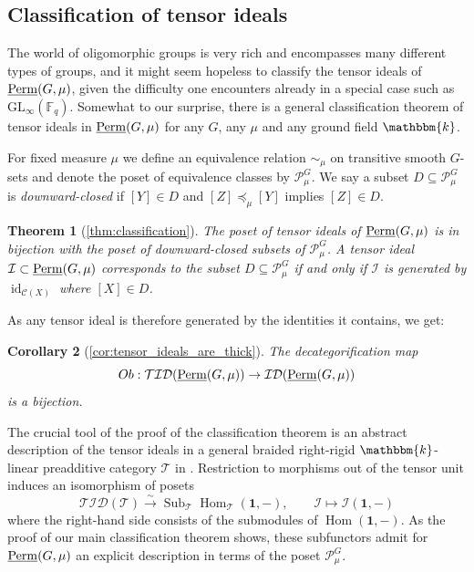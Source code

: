 \documentclass[11pt,a4paper]{amsart}
\theoremstyle{plain}%
\newtheorem{introtheorem}{Theorem}
\newtheorem{introcorollary}[introtheorem]{Corollary}
\theoremstyle{definition}
\theoremstyle{remark}
\newcommand{\Hom}{\operatorname{Hom}}
\newcommand{\id}{\operatorname{id}}
\newcommand{\Perm}{\underline{{\rm Perm}}}
\newcommand{\F}{{\mathbb F}}
\newcommand{\kk}{\mathbbm{k}}
\newcommand{\one}{{\mathbf{1}}}
\newcommand{\TID}{\mathcal{TID}}
\newcommand{\ID}{\mathcal{ID}}
\newcommand{\I}{\mathcal{I}}
\begin{document}
\subsection{Classification of tensor ideals}

The world of oligomorphic groups is very rich and encompasses many different types of groups, and it might seem hopeless to classify the tensor ideals of $\Perm(G,\mu)$, given the difficulty one encounters already in a special case such as $\mathrm{GL}_{\infty}(\F_q)$. Somewhat to our surprise, there is a general classification theorem of tensor ideals in $\Perm(G,\mu)$ for any $G$, any $\mu$ and any ground field $\kk$.

For fixed measure $\mu$ we define an equivalence relation $\sim_{\mu}$ on transitive smooth $G$-sets and denote the poset of equivalence classes by $\mathcal{P}_{\mu}^G$. We say a subset $D \subseteq \mathcal{P}^G_\mu$ is \emph{downward-closed} if $[Y] \in D$ and $[Z] \preceq_\mu [Y]$ implies $[Z] \in D$. 

\begin{introtheorem} [\cref{thm:classification}]
    The poset of tensor ideals of $\Perm(G, \mu)$ is in bijection with the poset of downward-closed subsets of $\mathcal{P}^G_\mu$. A tensor ideal $\mathcal{I}\subset\Perm(G, \mu)$ corresponds to the subset $D\subseteq \mathcal{P}^G_\mu$ if {and} only if $\mathcal{I}$ is generated by $\id_{\mathcal{C}(X)}$ where $[X]\in D$.
\end{introtheorem}

As any tensor ideal is therefore generated by the identities it contains, we get:

\begin{introcorollary} [\cref{cor:tensor_ideals_are_thick}] The decategorification map \[ Ob: \TID(\Perm(G, \mu)) \to \ID(\Perm(G, \mu))\] is a bijection.
\end{introcorollary}

The crucial tool of the proof of the classification theorem is an abstract description of the tensor ideals in a general braided right-rigid $\kk$-linear preadditive category $\mathcal{T}$ in \cite{Coulembier-ideals}. Restriction to morphisms out of the tensor unit induces an isomorphism of posets
\[
 \mathcal{TID}(\mathcal T)
 \xrightarrow{\sim}
 \operatorname{Sub}_{\mathcal T}\Hom_{\mathcal T}(\one,-),
 \qquad
 \I\longmapsto \I(\one,-)
\]
where the right-hand side consists of the submodules of $\Hom(\one,-)$. As the proof of our main classification theorem shows, these subfunctors admit for $\Perm(G,\mu)$ an explicit description in terms of the poset $\mathcal{P}_{\mu}^G$.
\end{document}
